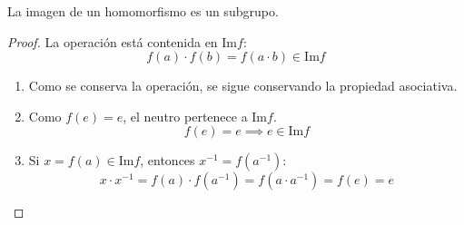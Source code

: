 \begin{thm}
    La imagen de un homomorfismo es un subgrupo.
\end{thm}

\begin{proof}
    La operación está contenida en $\text{Im} f$:
    \begin{equation}
        f(a) \cdot f(b) = f(a\cdot b) \in \text{Im} f
    \end{equation}

    \begin{enumerate}
        \item Como se conserva la operación, se sigue conservando la propiedad asociativa.
        \item Como $f(e) = e$, el neutro pertenece a $\text{Im} f$.
        \begin{equation}
            f(e) = e \implies e \in \text{Im} f
        \end{equation}
        \item Si $x = f(a) \in \text{Im} f$, entonces $x^{-1} = f(a^{-1})$:
        \begin{equation}
            x \cdot x^{-1} = f(a) \cdot f(a^{-1}) = f(a\cdot a^{-1}) = f(e) = e
        \end{equation}
    \end{enumerate}
\end{proof}

